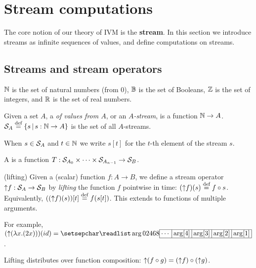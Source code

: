 \section{Stream computations}\label{sec:streams}

The core notion of our theory of IVM is the \textbf{stream}.  In this
section we introduce streams as infinite sequences of values, and
define computations on streams.

\subsection{Streams and stream operators}\label{sec:notation}

$\mathbb{N}$ is the set of natural numbers (from 0), $\mathbb{B}$ is the set of
Booleans, $\mathbb{Z}$ is the set of integers, and $\mathbb{R}$ is the set of real
numbers.

\begin{definition}[stream]
Given a set $A$, a  \emph{of values from $A$}, or an
\emph{$A$-stream}, is a function $\mathbb{N} \rightarrow A$.  $\mathcal{S}_{A}
\stackrel{\textrm{\scriptsize def}}{=} \{ s \,|\, s : \mathbb{N} \to A \}$ is the set of all $A$-streams.
\end{definition}

When $s\in\mathcal{S}_{A}$ and $t\in\mathbb{N}$ we
write $s[t]$ for the $t$-th element of the stream $s$.

\begin{definition}
A  is a function
$T:\mathcal{S}_{A_0}\times\cdots\times\mathcal{S}_{A_{n-1}}\to\mathcal{S}_{B}$.
\end{definition}

\begin{definition}(lifting)
Given a (scalar) function $f: A \to B$,
we define a stream operator ${\uparrow}f :\mathcal{S}_{A} \to \mathcal{S}_{B}$
by \emph{lifting} the function $f$ pointwise in time: $({\uparrow}f)(s) \stackrel{\textrm{\scriptsize def}}{=} f \circ s$.
Equivalently, $(({\uparrow}f)(s))[t] \stackrel{\textrm{\scriptsize def}}{=} f(s[t])$.
This extends to functions of multiple arguments.
\end{definition}

\ifstreamexamples
For example, $(\lift{(\lambda x.(2x))})(id) = \sv{0 2 4 6 8}$.
\fi

\begin{proposition}[distributivity]\label{prop:distributivity}
Lifting distributes over function composition:
${\uparrow}(f \circ g) = ({\uparrow}f) \circ ({\uparrow}g)$.
\end{proposition}
\begin{comment}
\begin{proof}
This is easily proved by using associativity of function composition:
$\forall s~.~(\lift{(f \circ g)})(s) = (f \circ g) \circ s =
f \circ (g \circ s) = f \circ (\lift{g})(s) = (\lift{f})((\lift{g})(s)) =
(\lift{f} \circ \lift{g})(s).$
\end{proof}
\end{comment}

